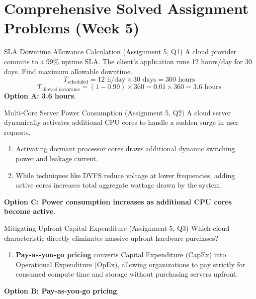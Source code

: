\section{Comprehensive Solved Assignment Problems (Week 5)}

\begin{solved}{SLA Downtime Allowance Calculation (Assignment 5, Q1)}
\Given A cloud provider commits to a 99\% uptime SLA. The client's application runs 12 hours/day for 30 days. Find maximum allowable downtime.
\Steps
\begin{equation}
T_{\text{scheduled}} = 12\text{ h/day} \times 30\text{ days} = 360\text{ hours}
\end{equation}
\begin{equation}
T_{\text{allowed downtime}} = (1 - 0.99) \times 360 = 0.01 \times 360 = 3.6\text{ hours}
\end{equation}
\Answer \textbf{Option A: 3.6 hours}.
\end{solved}

\begin{solved}{Multi-Core Server Power Consumption (Assignment 5, Q2)}
\Given A cloud server dynamically activates additional CPU cores to handle a sudden surge in user requests.
\Steps
\begin{enumerate}[leftmargin=*]
  \item Activating dormant processor cores draws additional dynamic switching power and leakage current.
  \item While techniques like DVFS reduce voltage at lower frequencies, adding active cores increases total aggregate wattage drawn by the system.
\end{enumerate}
\Answer \textbf{Option C: Power consumption increases as additional CPU cores become active}.
\end{solved}

\begin{solved}{Mitigating Upfront Capital Expenditure (Assignment 5, Q3)}
\Given Which cloud characteristic directly eliminates massive upfront hardware purchases?
\Steps
\begin{enumerate}[leftmargin=*]
  \item \textbf{Pay-as-you-go pricing} converts Capital Expenditure (CapEx) into Operational Expenditure (OpEx), allowing organizations to pay strictly for consumed compute time and storage without purchasing servers upfront.
\end{enumerate}
\Answer \textbf{Option B: Pay-as-you-go pricing}.
\end{solved}

